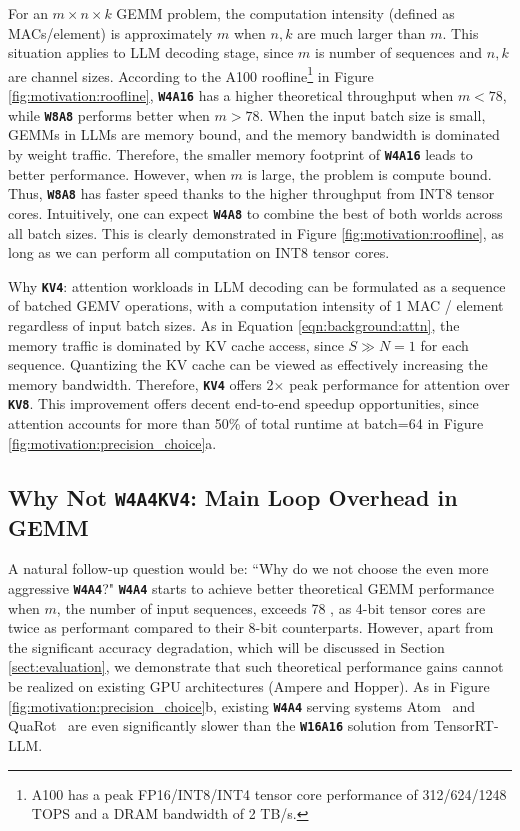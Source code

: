 For an $m\times n\times k$ GEMM problem, the computation intensity (defined as MACs/element) is approximately $m$ when $n, k$ are much larger than $m$. This situation applies to LLM decoding stage, since $m$ is number of sequences and $n, k$ are channel sizes. According to the A100 roofline\footnote{A100 has a peak FP16/INT8/INT4 tensor core performance of 312/624/1248 TOPS and a DRAM bandwidth of 2 TB/s.} in Figure \ref{fig:motivation:roofline}, \textbf{\texttt{W4A16}} has a higher theoretical throughput when $m < 78$, while \textbf{\texttt{W8A8}} performs better when $m > 78$. When the input batch size is small, GEMMs in LLMs are memory bound, and the memory bandwidth is dominated by weight traffic. Therefore, the smaller memory footprint of \textbf{\texttt{W4A16}} leads to better performance. However, when $m$ is large, the problem is compute bound. Thus, \textbf{\texttt{W8A8}} has faster speed thanks to the higher throughput from INT8 tensor cores. Intuitively, one can expect \textbf{\texttt{W4A8}} to combine the best of both worlds across all batch sizes. This is clearly demonstrated in Figure \ref{fig:motivation:roofline}, as long as we can perform all computation on INT8 tensor cores. 

Why \textbf{\texttt{KV4}}: attention workloads in LLM decoding can be formulated as a sequence of batched GEMV operations, with a computation intensity of 1 MAC / element regardless of input batch sizes. As in Equation \ref{eqn:background:attn}, the memory traffic is dominated by KV cache access, since $S \gg N = 1$ for each sequence. Quantizing the KV cache can be viewed as effectively increasing the memory bandwidth. Therefore, \textbf{\texttt{KV4}} offers 2$\times$ peak performance for attention over \textbf{\texttt{KV8}}. This improvement offers decent end-to-end speedup opportunities, since attention accounts for more than 50\% of total runtime at batch=64 in Figure \ref{fig:motivation:precision_choice}a. 

\subsection{Why Not \textbf{\texttt{W4A4KV4}}: Main Loop Overhead in GEMM}


\label{sect:motivation:dequantization-overhead}

A natural follow-up question would be: ``Why do we not choose the even more aggressive \textbf{\texttt{W4A4}}?" \textbf{\texttt{W4A4}} starts to achieve better theoretical GEMM performance when $m$, the number of input sequences, exceeds 78%
, as 4-bit tensor cores are twice as performant compared to their 8-bit counterparts. However, apart from the significant accuracy degradation, which will be discussed in Section \ref{sect:evaluation}, we demonstrate that such theoretical performance gains cannot be realized on existing GPU architectures (Ampere and Hopper). As in Figure \ref{fig:motivation:precision_choice}b, existing \textbf{\texttt{W4A4}} serving systems Atom~\cite{zhao2023atom} and QuaRot~\cite{ashkboos2024quarot} are even significantly slower than the \textbf{\texttt{W16A16}} solution from TensorRT-LLM. 

